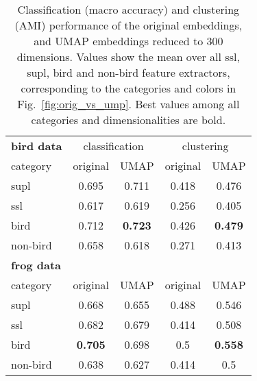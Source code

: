 \begin{table}[t]
  
  \caption{Classification (macro accuracy) and clustering (AMI) performance of the original embeddings, and UMAP embeddings reduced to 300 dimensions. Values show the mean over all ssl, supl, bird and non-bird feature extractors, corresponding to the categories and colors in Fig.~\ref{fig:orig_vs_ump}. Best values among all categories and dimensionalities are bold.}
  \label{tab:results}
  \centering
  \begin{tabular}{l|cc|cc}
    \textbf{bird data}& \multicolumn{2}{c|}{classification} & \multicolumn{2}{c}{clustering}\\
    category &
    original &
    UMAP &
    original &
    UMAP \\
    \hline
    supl & 0.695 & {0.711} & 0.418 & {0.476}\\
    ssl & 0.617 & {0.619} & 0.256 & {0.405}\\
    bird & 0.712 & {\textbf{0.723}} & 0.426 & {\textbf{0.479}}\\
    non-bird & {0.658} & 0.618 & 0.271 & {0.413}\\
    \textbf{frog data}& &&& \\
    category &
    original &
    UMAP &
    original &
    UMAP \\
    \hline
    supl & {0.668} & 0.655 & 0.488 & {0.546}\\
    ssl & {0.682} & 0.679 & 0.414 & {0.508}\\
    bird & {\textbf{0.705}} & 0.698 & 0.5 & {\textbf{0.558}}\\
    non-bird & 0.638 & 0.627 & 0.414 & {0.5}\\
    
    
  \end{tabular}
\end{table}